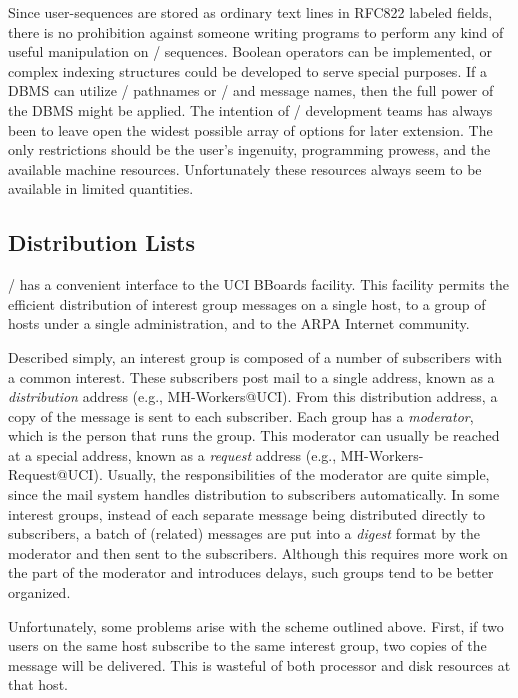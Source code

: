 Since user-sequences are stored as ordinary text lines in RFC822 labeled
fields,
there is no prohibition against someone writing programs to perform
any kind of useful manipulation on \MH/ sequences.
Boolean operators can be implemented,
or complex indexing structures could be developed to serve special purposes.
If a DBMS can utilize \unix/ pathnames or \MH/  and
message names,
then the full power of the DBMS might be applied.
The intention of \MH/ development teams has always been to leave open the
widest possible array of options for later extension.
The only restrictions should be the user's ingenuity,
programming prowess, and the available machine resources.
Unfortunately these resources always seem to be available in
limited quantities.

\subsection{Distribution Lists}			%
\MH/ has a convenient interface to the UCI BBoards facility\cite{MRose84a}.%
This facility permits the efficient distribution of interest group messages
on a single host,
to a group of hosts under a single administration,
and to the ARPA Internet community.

Described simply, an interest group is composed of a number of subscribers
with a common interest.
These subscribers post mail to a single address, known as a
{\it distribution} address (e.g., {\tx MH-Workers@UCI}).
From this distribution address, a copy of the message is sent to each
subscriber.
Each group has a {\it moderator},
which is the person that runs the group.
This moderator can usually be reached at a special address,
known as a {\it request} address (e.g., {\tx MH-Workers-Request@UCI}).
Usually, the responsibilities of the moderator are quite simple,
since the mail system handles distribution to subscribers automatically.
In some interest groups,
instead of each separate message being distributed directly to subscribers,
a batch of (related) messages are put into a {\it digest} format by the
moderator and then sent to the subscribers.
Although this requires more work on the part of the moderator
and introduces delays,
such groups tend to be better organized.

Unfortunately, some problems arise with the scheme outlined above.
First, if two users on the same host subscribe to the same interest group,
two copies of the message will be delivered.
This is wasteful of both processor and disk resources at that host.

